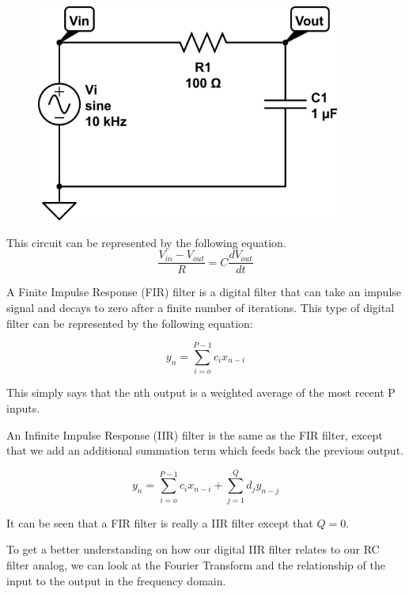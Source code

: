 {\begin{figure}[h!tb] 
\centering
\includegraphics[width=10cm]{Images/rc-circuit.png}
\label{rc_circuit}
\end{figure}
}

This circuit can be represented by the following equation.
\begin{equation}\label{eq:rc_circuit_eq}
\frac{V_{in}-V_{out}}{R}=C\frac{dV_{out}}{dt}
\end{equation}

A Finite Impulse Response (FIR) filter is a digital filter that can take an impulse signal and decays to zero after a finite number of iterations.  This type of digital filter can be represented by the following equation:

\begin{equation}
y_n=\displaystyle\sum\limits_{i=o}^{P-1} c_ix_{n-i}
\end{equation}

This simply says that the nth output is a weighted average of the most recent P inputs.  

An Infinite Impulse Response (IIR) filter is the same as the FIR filter, except that we add an additional summation term which feeds back the previous output.

\begin{equation}
y_n=\displaystyle\sum\limits_{i=o}^{P-1} c_ix_{n-i}+\displaystyle\sum\limits_{j=1}^{Q} d_jy_{n-j}
\end{equation}

It can be seen that a FIR filter is really a IIR filter except that $Q=0$.  

To get a better understanding on how our digital IIR filter relates to our RC filter analog, we can look at the Fourier Transform and the relationship of the input to the output in the frequency domain.

